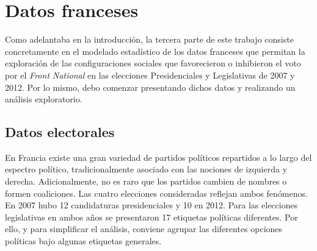 \chapter{Datos franceses}

Como adelantaba en la introducción, la tercera parte de este trabajo consiste concretamente en el modelado estadístico de los datos franceses que permitan la exploración de las configuraciones sociales que favorecieron o inhibieron el voto por el \textit{Front National} en las elecciones Presidenciales y Legislativas de 2007 y 2012. Por lo mismo, debo comenzar  presentando dichos datos y realizando un análisis exploratorio.

\section{Datos electorales}

En Francia existe una gran variedad de partidos políticos repartidos a lo largo del espectro político, tradicionalmente asociado con las nociones de izquierda y derecha. Adicionalmente, no es raro que los partidos cambien de nombres o formen coaliciones. Las cuatro elecciones consideradas reflejan ambos fenómenos. En 2007 hubo 12 candidaturas presidenciales y 10 en 2012. Para las elecciones legislativas en ambos años se presentaron 17 etiquetas políticas diferentes. Por ello, y para simplificar el análisis, conviene agrupar las diferentes opciones políticas bajo algunas etiquetas generales.\\ 

